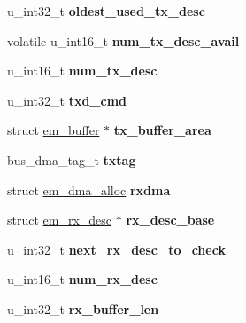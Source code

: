 \begin{DoxyCompactItemize}
u\+\_\+int32\+\_\+t {\bfseries oldest\+\_\+used\+\_\+tx\+\_\+desc}
\item 
\mbox{\label{structadapter_a0b4dd10bd035bc5d87360085e94f081b}} 
volatile u\+\_\+int16\+\_\+t {\bfseries num\+\_\+tx\+\_\+desc\+\_\+avail}
\item 
\mbox{\label{structadapter_a252e82050ecab11f8662e0f046f7131e}} 
u\+\_\+int16\+\_\+t {\bfseries num\+\_\+tx\+\_\+desc}
\item 
\mbox{\label{structadapter_aaf08aba3a3b450d820856bd8b0fe0d6f}} 
u\+\_\+int32\+\_\+t {\bfseries txd\+\_\+cmd}
\item 
\mbox{\label{structadapter_aae95251b80abbe9d1dd9d577f6f4b95b}} 
struct \mbox{\hyperlink{structem__buffer}{em\+\_\+buffer}} $\ast$ {\bfseries tx\+\_\+buffer\+\_\+area}
\item 
\mbox{\label{structadapter_a3f5a5d2ca7223c074c0ba383f4182d49}} 
bus\+\_\+dma\+\_\+tag\+\_\+t {\bfseries txtag}
\item 
\mbox{\label{structadapter_a3c1f2fe7c61516f84b7f64bf1a776759}} 
struct \mbox{\hyperlink{structem__dma__alloc}{em\+\_\+dma\+\_\+alloc}} {\bfseries rxdma}
\item 
\mbox{\label{structadapter_af9b863cc418504a600bb0d04f1c804a5}} 
struct \mbox{\hyperlink{structem__rx__desc}{em\+\_\+rx\+\_\+desc}} $\ast$ {\bfseries rx\+\_\+desc\+\_\+base}
\item 
\mbox{\label{structadapter_a657470c996ce19f16bc57f12f253770c}} 
u\+\_\+int32\+\_\+t {\bfseries next\+\_\+rx\+\_\+desc\+\_\+to\+\_\+check}
\item 
\mbox{\label{structadapter_a07182121c4cea93575d9b5f0a35b1268}} 
u\+\_\+int16\+\_\+t {\bfseries num\+\_\+rx\+\_\+desc}
\item 
\mbox{\label{structadapter_af8b3735fc2e7a8127fa71dd882197891}} 
u\+\_\+int32\+\_\+t {\bfseries rx\+\_\+buffer\+\_\+len}
\item 
\mbox{\label{structadapter_a4e82d21a78ae1f691e59dbdad7497d95}} 

\end{DoxyCompactItemize}
